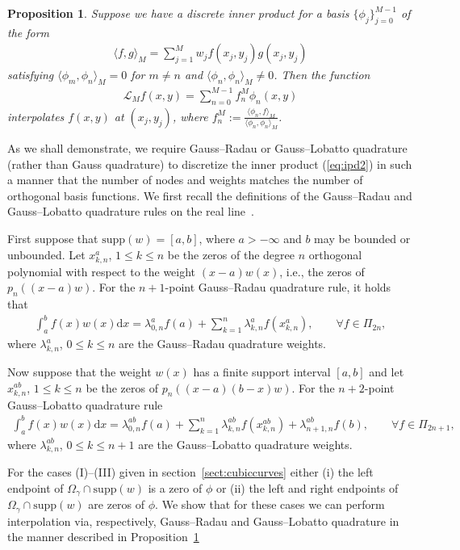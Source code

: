 \documentclass{amsart}
\newtheorem{prop}[thm]{Proposition}
\theoremstyle{remark}
\def\la{{\langle}}
\def\ra{{\rangle}}
\def\d{\mathrm{d}}
\def\g{{\gamma}}
\def\la{{\langle}}
\def\ra{{\rangle}}
\def\CL{{\mathcal L}}
\begin{document}
\begin{prop} \label{prop:intviaquad}
Suppose we have a discrete inner product for a basis $\lbrace \phi_j \rbrace_{j=0}^{M-1}$ of the form
\begin{align*}
\la f, g \ra_{M} = \sum_{j = 1}^M w_j f(x_j,y_j)g(x_j,y_j)
\end{align*}
satisfying $\la \phi_m, \phi_n \ra_{M} = 0$ for $m \neq n$ and $\la \phi_n, \phi_n \ra_{M} \neq 0$. Then the function
\begin{align*}
\CL_M f(x,y) = \sum_{n = 0}^{M-1} f_{n}^{M}\phi_n(x,y)
\end{align*}
interpolates $f(x,y)$ at $(x_j,y_j)$, where $f_n^M := \frac{\la \phi_n, f \ra_M}{\la \phi_n, \phi_n \ra_{M}}$.
\end{prop}

As we shall demonstrate, we require Gauss--Radau or Gauss--Lobatto quadrature (rather than Gauss quadrature) to discretize the inner product (\ref{eq:ipd2}) in such a manner that the number of nodes and weights matches the number of orthogonal basis functions. We first recall the definitions of the Gauss--Radau and Gauss--Lobatto quadrature rules on the real line~\cite{gautschi}. 

First suppose that $\mathrm{supp}(w) = [a, b]$, where $a >-\infty$ and $b$ may be bounded or unbounded. Let $x^{a}_{k,n}$, $1 \leq k \leq n$ be the zeros of the degree $n$ orthogonal polynomial with respect to the weight $(x-a)w(x)$, i.e., the zeros of $p_n((x-a)w)$. For the $n + 1$-point Gauss--Radau quadrature rule, it holds that
\begin{align*}
\int_a^b f(x) w(x) \d x = \lambda_{0,n}^a f(a) +   \sum_{k=1}^n \lambda_{k,n}^a f(x_{k,n}^a), \qquad \forall f\in \Pi_{2n},
\end{align*}
where $\lambda_{k,n}^a$, $0 \leq k \leq n$ are the Gauss--Radau quadrature weights.

Now suppose that the weight $w(x)$ has a finite support interval $[a, b]$ and let $x^{ab}_{k,n}$, $1 \leq k \leq n$ be the zeros of $p_n((x-a)(b-x)w)$. For the $n + 2$-point Gauss--Lobatto quadrature rule
\begin{align*}
\int_{a}^{b} f(x) w(x) \d x = \lambda_{0,n}^{ab} f(a) +   \sum_{k=1}^n \lambda_{k,n}^{ab} f(x_{k,n}^{ab}) + \lambda_{n+1,n}^{ab} f(b), \qquad \forall f\in \Pi_{2n+1},
\end{align*}
where $\lambda_{k,n}^{ab}$, $0 \leq k \leq n+1$ are the Gauss--Lobatto quadrature weights.

For the cases (I)--(III) given in section~\ref{sect:cubiccurves}
 either (i)  the left endpoint of $\Omega_\g \cap \mathrm{supp}(w)$  is a zero of $\phi $ or (ii) the left and right endpoints of $\Omega_\g \cap \mathrm{supp}(w)$ are zeros of $\phi $. We show that for these cases we can  perform interpolation via, respectively, Gauss--Radau and Gauss--Lobatto quadrature  in the manner described in Proposition~\ref{prop:intviaquad}
\end{document}
